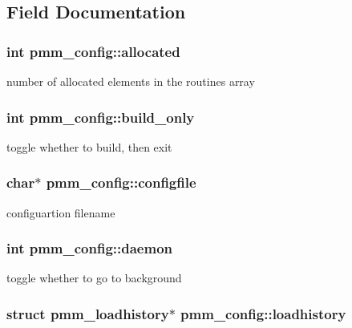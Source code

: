 \subsection{Field Documentation}
\hypertarget{structpmm__config_a2e17e77ff1b0eba2b745797efabc8417}{
\subsubsection[{allocated}]{\setlength{\rightskip}{0pt plus 5cm}int pmm\-\_\-config\-::allocated}}\label{structpmm__config_a2e17e77ff1b0eba2b745797efabc8417}
number of allocated elements in the routines array \hypertarget{structpmm__config_a346f675b50aba01ba840b70684ba7c8d}{
\subsubsection[{build\-\_\-only}]{\setlength{\rightskip}{0pt plus 5cm}int pmm\-\_\-config\-::build\-\_\-only}}\label{structpmm__config_a346f675b50aba01ba840b70684ba7c8d}
toggle whether to build, then exit \hypertarget{structpmm__config_abce777ea95f0905bbba64cf688234dde}{
\subsubsection[{configfile}]{\setlength{\rightskip}{0pt plus 5cm}char$\ast$ pmm\-\_\-config\-::configfile}}\label{structpmm__config_abce777ea95f0905bbba64cf688234dde}
configuartion filename \hypertarget{structpmm__config_a30cbf3b55d31335339596fe9257ebf71}{
\subsubsection[{daemon}]{\setlength{\rightskip}{0pt plus 5cm}int pmm\-\_\-config\-::daemon}}\label{structpmm__config_a30cbf3b55d31335339596fe9257ebf71}
toggle whether to go to background \hypertarget{structpmm__config_a123ca15345aaf8f2645004386a976d6f}{
\subsubsection[{loadhistory}]{\setlength{\rightskip}{0pt plus 5cm}struct {\bf pmm\-\_\-loadhistory}$\ast$ pmm\-\_\-config\-::loadhistory}}\label{structpmm__config_a123ca15345aaf8f2645004386a976d6f}
